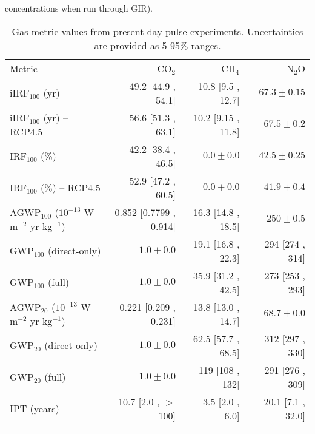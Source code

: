 \documentclass[gmd, manuscript]{copernicus}
\begin{document}
concentrations when run through GIR).\\

\begin{table}[t]
    \caption{Gas metric values from present-day pulse experiments. Uncertainties are provided as 5-95\% ranges.} \label{tab:metricresults}
    \begin{tabular}{l r r r}
    \tophline
        Metric & CO$_2$ & CH$_4$ & N$_2$O\\
    \middlehline
        iIRF$_{100}$ (yr) & 49.2 [44.9 , 54.1] & 10.8 [9.5 , 12.7] & $67.3 \pm 0.15$ \\
        iIRF$_{100}$ (yr) -- RCP4.5 & 56.6 [51.3 , 63.1] & 10.2 [9.15 , 11.8] & $67.5 \pm 0.2$ \\
        IRF$_{100}$ (\%) & 42.2 [38.4 , 46.5] & $0.0 \pm 0.0$ & $42.5 \pm 0.25$ \\
        IRF$_{100}$ (\%) -- RCP4.5 & 52.9 [47.2 , 60.5] & $0.0 \pm 0.0$ & $41.9 \pm 0.4$ \\
        AGWP$_{100}$ ($10^{-13}$ W m$^{-2}$ yr kg$^{-1}$) & 0.852 [0.7799 , 0.914] & 16.3 [14.8 , 18.5] & $250 \pm 0.5$ \\ 
        GWP$_{100}$ (direct-only) & $1.0 \pm 0.0$ & 19.1 [16.8 , 22.3] & 294 [274 , 314] \\
        GWP$_{100}$ (full) & $1.0 \pm 0.0$ & 35.9 [31.2 , 42.5] & 273 [253 , 293] \\
        AGWP$_{20}$ ($10^{-13}$ W m$^{-2}$ yr kg$^{-1}$) & 0.221 [0.209 , 0.231] & 13.8 [13.0 , 14.7] & $68.7 \pm 0.0$ \\ 
        GWP$_{20}$ (direct-only) & $1.0 \pm 0.0$ & 62.5 [57.7 , 68.5] & 312 [297 , 330] \\
        GWP$_{20}$ (full) & $1.0 \pm 0.0$ & 119 [108 , 132] & 291 [276 , 309] \\
        IPT (years) & 10.7 [2.0 , $>$100] & 3.5 [2.0 , 6.0] & 20.1 [7.1 , 32.0] \\
    \bottomhline
    \end{tabular}
    \belowtable{} %
\end{table}
\end{document}
